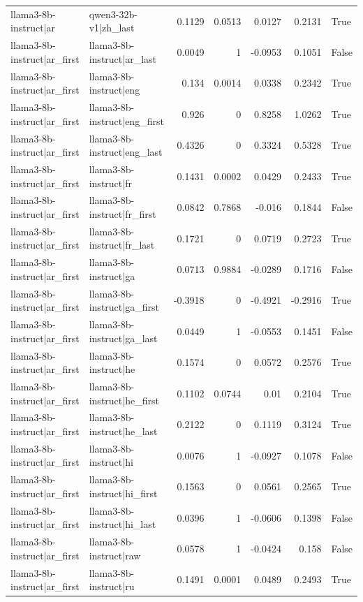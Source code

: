 \begin{table}
\begin{tabular}{l l r r r r l}
llama3-8b-instruct|ar & qwen3-32b-v1|zh_last & 0.1129 & 0.0513 & 0.0127 & 0.2131 & True \\
llama3-8b-instruct|ar_first & llama3-8b-instruct|ar_last & 0.0049 & 1 & -0.0953 & 0.1051 & False \\
llama3-8b-instruct|ar_first & llama3-8b-instruct|eng & 0.134 & 0.0014 & 0.0338 & 0.2342 & True \\
llama3-8b-instruct|ar_first & llama3-8b-instruct|eng_first & 0.926 & 0 & 0.8258 & 1.0262 & True \\
llama3-8b-instruct|ar_first & llama3-8b-instruct|eng_last & 0.4326 & 0 & 0.3324 & 0.5328 & True \\
llama3-8b-instruct|ar_first & llama3-8b-instruct|fr & 0.1431 & 0.0002 & 0.0429 & 0.2433 & True \\
llama3-8b-instruct|ar_first & llama3-8b-instruct|fr_first & 0.0842 & 0.7868 & -0.016 & 0.1844 & False \\
llama3-8b-instruct|ar_first & llama3-8b-instruct|fr_last & 0.1721 & 0 & 0.0719 & 0.2723 & True \\
llama3-8b-instruct|ar_first & llama3-8b-instruct|ga & 0.0713 & 0.9884 & -0.0289 & 0.1716 & False \\
llama3-8b-instruct|ar_first & llama3-8b-instruct|ga_first & -0.3918 & 0 & -0.4921 & -0.2916 & True \\
llama3-8b-instruct|ar_first & llama3-8b-instruct|ga_last & 0.0449 & 1 & -0.0553 & 0.1451 & False \\
llama3-8b-instruct|ar_first & llama3-8b-instruct|he & 0.1574 & 0 & 0.0572 & 0.2576 & True \\
llama3-8b-instruct|ar_first & llama3-8b-instruct|he_first & 0.1102 & 0.0744 & 0.01 & 0.2104 & True \\
llama3-8b-instruct|ar_first & llama3-8b-instruct|he_last & 0.2122 & 0 & 0.1119 & 0.3124 & True \\
llama3-8b-instruct|ar_first & llama3-8b-instruct|hi & 0.0076 & 1 & -0.0927 & 0.1078 & False \\
llama3-8b-instruct|ar_first & llama3-8b-instruct|hi_first & 0.1563 & 0 & 0.0561 & 0.2565 & True \\
llama3-8b-instruct|ar_first & llama3-8b-instruct|hi_last & 0.0396 & 1 & -0.0606 & 0.1398 & False \\
llama3-8b-instruct|ar_first & llama3-8b-instruct|raw & 0.0578 & 1 & -0.0424 & 0.158 & False \\
llama3-8b-instruct|ar_first & llama3-8b-instruct|ru & 0.1491 & 0.0001 & 0.0489 & 0.2493 & True \\

\end{tabular}
\end{table}
